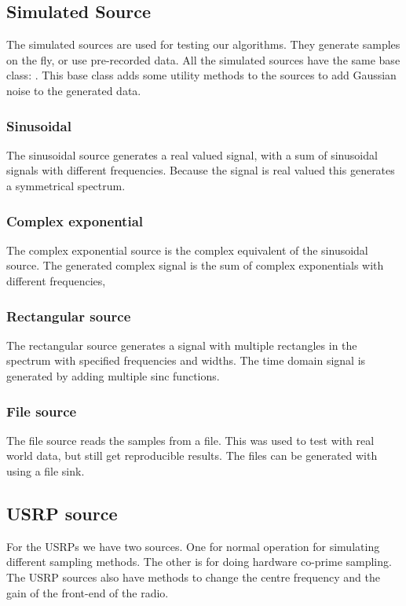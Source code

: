 \documentclass[a4paper, openany, oneside]{memoir}
\begin{document}
\subsection{Simulated Source}
\label{sec:simulated-source}
The simulated sources are used for testing our algorithms. They generate samples on the fly, or use pre-recorded data. All the simulated sources have the same base class: . This base class adds some utility methods to the sources to add Gaussian noise to the generated data.

\subsubsection{Sinusoidal}
The sinusoidal source generates a real valued signal, with a sum of sinusoidal signals with different frequencies. Because the signal is real valued this generates a symmetrical spectrum.

\subsubsection{Complex exponential}
The complex exponential source is the complex equivalent of the sinusoidal source. The generated complex signal is the sum of complex exponentials with different frequencies,

\subsubsection{Rectangular source}
The rectangular source generates a signal with multiple rectangles in the spectrum with specified frequencies and widths. The time domain signal is generated by adding multiple sinc functions.

\subsubsection{File source}
The file source reads the samples from a file. This was used to test with real world data, but still get reproducible results. The files can be generated with  using a file sink.

\subsection{USRP source}
For the USRPs we have two sources. One for normal operation for simulating different sampling methods. The other is for doing hardware co-prime sampling. The USRP sources also have methods to change the centre frequency and the gain of the front-end of the radio.
\end{document}
